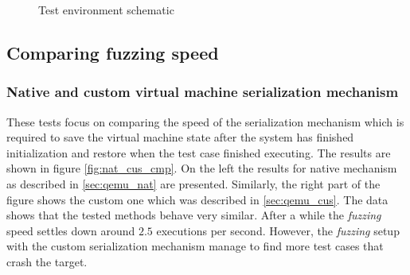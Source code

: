
\begin{figure}[h!]
    \centering

    
    \caption{Test environment schematic}
    \label{fig:testenvirsch}
\end{figure}

\subsection{Comparing fuzzing speed}

\subsubsection{Native and custom virtual machine serialization mechanism}

These tests focus on comparing the speed of the serialization mechanism which is required to save the virtual machine state after the system has finished initialization and restore when the test case finished executing. The results are shown in figure \ref{fig:nat_cus_cmp}. On the left the results for native mechanism as described in \ref{sec:qemu_nat} are presented. Similarly, the right part of the figure shows the custom one which was described in \ref{sec:qemu_cus}. The data shows that the tested methods behave very similar. After a while the \textit{fuzzing} speed settles down around $2.5$ executions per second. However, the \textit{fuzzing} setup with the custom serialization mechanism manage to find more test cases that crash the target.

